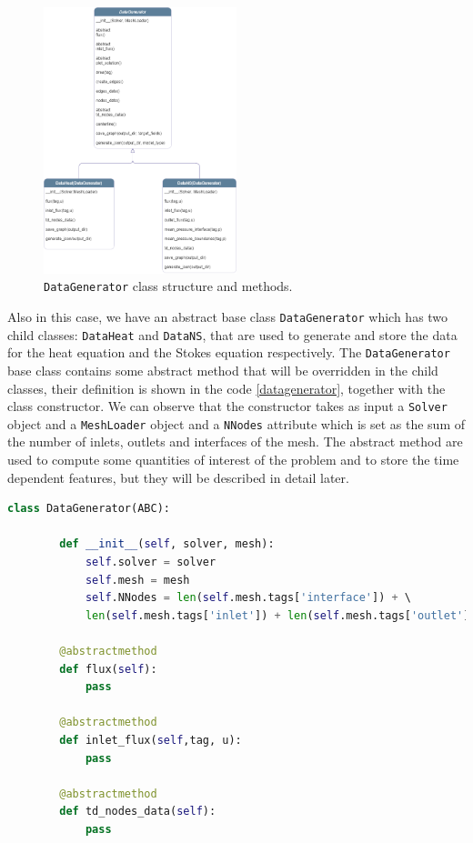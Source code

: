 \documentclass[11pt,a4paper]{article}
\begin{document}
\begin{figure}[H]
    \centering
    \includegraphics[width=0.5\textwidth]{Images/datagenerator_class.png}
    \caption{\texttt{DataGenerator} class structure and methods.}
    \label{datagenerator_class}
\end{figure}

Also in this case, we have an abstract base class \texttt{DataGenerator} which has two child classes: \texttt{DataHeat} and \texttt{DataNS}, that are used to generate and store the data for the heat equation and the Stokes equation respectively.
The \texttt{DataGenerator} base class contains some abstract method that will be overridden in the child classes, their definition is shown in the code \ref{datagenerator}, together with the class constructor. We can observe that the constructor takes as input a \texttt{Solver} object and a \texttt{MeshLoader} object and a \texttt{NNodes} attribute which is set as the sum of the number of inlets, outlets and interfaces of the mesh. The abstract method are used to compute some quantities of interest of the problem and to store the time dependent features, but they will be described in detail later.

\begin{lstlisting}[language=Python, caption={DataGenerator abstract class.}, label={datagenerator}]
    class DataGenerator(ABC):

        def __init__(self, solver, mesh):
            self.solver = solver
            self.mesh = mesh
            self.NNodes = len(self.mesh.tags['interface']) + \ 
            len(self.mesh.tags['inlet']) + len(self.mesh.tags['outlet'])

        @abstractmethod
        def flux(self):
            pass

        @abstractmethod
        def inlet_flux(self,tag, u):
            pass

        @abstractmethod
        def td_nodes_data(self):
            pass
        
\end{lstlisting}
\end{document}
